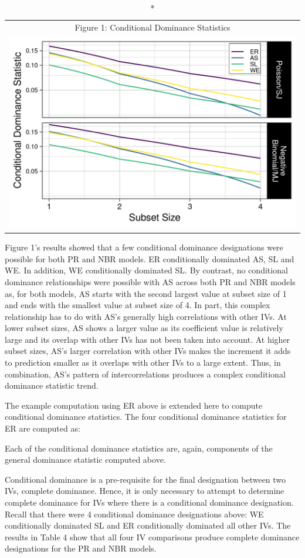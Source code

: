 \documentclass[ShortAfour,times,sageapa]{sagej}
\begin{document}
	\begin{longtable}{c}
		\caption*{
			{\large Figure 1: Conditional Dominance Statistics}
		} \\ 
		\includegraphics{includes/condit_gph}
	\end{longtable}

	Figure 1's results showed that a few conditional dominance designations were possible for both PR and NBR models.
	ER conditionally dominated AS, SL and WE. 
	In addition, WE conditionally dominated SL.
	By contrast, no conditional dominance relationships were possible with AS across both PR and NBR models as, for both models, AS starts with the second largest value at subset size of 1 and ends with the smallest value at subset size of 4.
	In part, this complex relationship has to do with AS's generally high correlations with other IVs. 
	At lower subset sizes, AS shows a larger value as its coefficient value is relatively large and its overlap with other IVs has not been taken into account.
	At higher subset sizes, AS's larger correlation with other IVs makes the increment it adds to prediction smaller as it overlaps with other IVs to a large extent.
	Thus, in combination, AS's pattern of intercorrelations produces a complex conditional dominance statistic trend.
	
	The example computation using ER above is extended here to compute conditional dominance statistics.
	The four conditional dominance statistics for ER are computed as:
	
	Each of the conditional dominance statistics are, again, components of the general dominance statistic computed above.
	
	Conditional dominance is a pre-requisite for the final designation between two IVs, complete dominance.
	Hence, it is only necessary to attempt to determine complete dominance for IVs where there is a conditional dominance designation.
	Recall that there were 4 conditional dominance designations above: WE conditionally dominated SL and ER conditionally dominated all other IVs. 
	The results in Table 4 show that all four IV comparisons produce complete dominance designations for the PR and NBR models.
	
\end{document}
